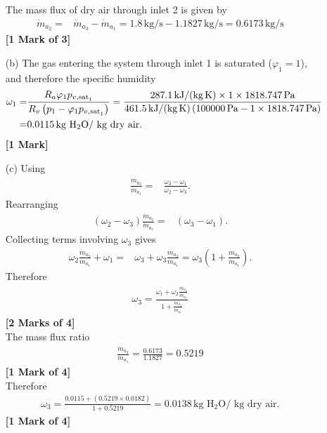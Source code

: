 \documentclass[12pt,twoside]{report}
\renewcommand\phi{\varphi}
\begin{document}
\begin{description}
\begin{itemize}
The mass flux of dry air through inlet 2 is given by
\begin{align*}
 \dot{m}_{a_2} =& \dot{m}_{a_3} - \dot{m}_{a_1} = 1.8\,\mbox{kg/s} - 1.1827\,\mbox{kg/s} = 0.6173\,\mbox{kg/s}
\end{align*} \hfill \textbf{[1 Mark of 3]}

\item[(b)] The gas entering the system through inlet 1 is saturated ($\phi_1 = 1$), and therefore the specific humidity
\begin{align*}
 \omega_1 =& \frac{R_a \phi_1 p_{{v,\text{sat}}_1}}{R_v \left(p_1 - \phi_1 p_{{v,\text{sat}}_1}\right)} = \frac{287.1\,\mbox{kJ/(kg\,K)} \times 1 \times 1818.747\,\mbox{Pa}}{461.5\,\mbox{kJ/(kg\,K)} \left(100000\,\mbox{Pa} - 1 \times 1818.747\,\mbox{Pa}\right)} \nonumber \\
 =& 0.0115\,\mbox{kg H$_2$O/ kg dry air}.
\end{align*} \hfill \textbf{[1 Mark]}

\item[(c)] Using
\begin{align*}
 \frac{\dot{m}_{a_2}}{\dot{m}_{a_1}} =& \frac{\omega_3 - \omega_1}{\omega_2 - \omega_3}.
\end{align*}
Rearranging
\begin{align*}
 \left(\omega_2 - \omega_3\right)\frac{\dot{m}_{a_2}}{\dot{m}_{a_1}} =& \left(\omega_3 - \omega_1\right).
\end{align*}
Collecting terms involving $\omega_3$ gives
\begin{align*}
 \omega_2 \frac{\dot{m}_{a_2}}{\dot{m}_{a_1}} + \omega_1 =& \omega_3 + \omega_3\frac{\dot{m}_{a_2}}{\dot{m}_{a_1}} = \omega_3 \left(1 + \frac{\dot{m}_{a_2}}{\dot{m}_{a_1}}\right).
\end{align*}
Therefore
\begin{align*}
 \omega_3 = \frac{\omega_1 + \omega_2 \frac{\dot{m}_{a_2}}{\dot{m}_{a_1}}}{1 + \frac{\dot{m}_{a_2}}{\dot{m}_{a_1}}}
\end{align*} \hfill \textbf{[2 Marks of 4]} \\
The mass flux ratio
\begin{align*}
 \frac{\dot{m}_{a_2}}{\dot{m}_{a_1}} = \frac{0.6173}{1.1827} = 0.5219
\end{align*} \hfill \textbf{[1 Mark of 4]} \\
Therefore
\begin{align*}
 \omega_3 = \frac{0.0115 + \left(0.5219 \times 0.0182\right)}{1 + 0.5219} = 0.0138\,\mbox{kg H$_2$O/ kg dry air}.
\end{align*} \hfill \textbf{[1 Mark of 4]} 
\end{itemize}

\end{description}

%
%
%
%
\end{document}
